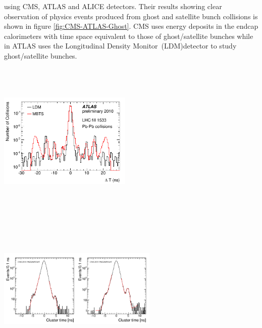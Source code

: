 using CMS, ATLAS and ALICE detectors.  Their results showing clear observation of physics events produced from
ghost and satellite bunch collisions is shown in figure \ref{fig:CMS-ATLAS-Ghost}.
 CMS uses energy deposits in the endcap calorimeters with time space equivalent to those of ghost/satellite bunches while in ATLAS
 uses the Longitudinal Density Monitor~(LDM)detector to study ghost/satellite bunches. 
\begin{center}
\centering
\mbox{\includegraphics[height=3.0in,width=2.5in]{THESISPLOTS/ATLAS-LDM-GHOST.png} \quad \quad
\includegraphics[height=3.0in,width=3.0in]{THESISPLOTS/CMS-Ghost-Profile.png}} 
\label{fig:CMS-ATLAS-Ghost}
\end{center}

